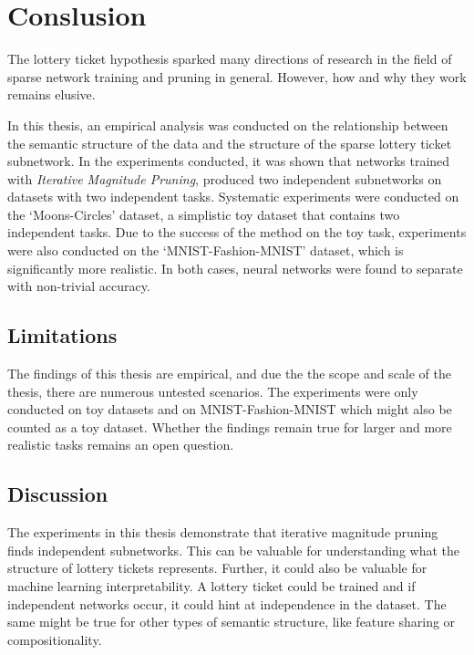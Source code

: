 \chapter{Conslusion}\label{chapter:conclusion} 

The lottery ticket hypothesis sparked many directions of research in the field of sparse network training and pruning in general.
However, how and why they work remains elusive.

In this thesis, an empirical analysis was conducted on the relationship between the semantic structure of the data and the structure of the sparse lottery ticket subnetwork.
In the experiments conducted, it was shown that networks trained with \textit{Iterative Magnitude Pruning}, produced two independent subnetworks on datasets with two independent tasks.
Systematic experiments were conducted on the `Moons-Circles' dataset, a simplistic toy dataset that contains two independent tasks.
Due to the success of the method on the toy task, experiments were also conducted on the `MNIST-Fashion-MNIST' dataset, which is significantly more realistic.
In both cases, neural networks were found to separate with non-trivial accuracy.

\section{Limitations}
The findings of this thesis are empirical, and due the the scope and scale of the thesis, there are numerous untested scenarios.
The experiments were only conducted on toy datasets and on MNIST-Fashion-MNIST which might also be counted as a toy dataset.
Whether the findings remain true for larger and more realistic tasks remains an open question.

\section{Discussion}
The experiments in this thesis demonstrate that iterative magnitude pruning finds independent subnetworks.
This can be valuable for understanding what the structure of lottery tickets represents.
Further, it could also be valuable for machine learning interpretability.
A lottery ticket could be trained and if independent networks occur, it could hint at independence in the dataset.
The same might be true for other types of semantic structure, like feature sharing or compositionality.

